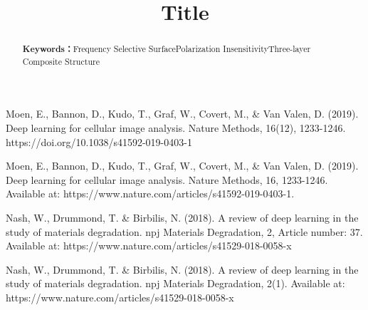 \documentclass[withoutpreface,bwprint]{cumcmthesis}
\title{Title}
\begin{document}
 \maketitle
\renewcommand{\abstractname}{Abstract}
\renewcommand{\keywords}{\textbf{Keywords：}}
\begin{abstract}
\begin{spacing}{1.6}

\end{spacing}
\noindent\keywords{Frequency Selective Surface\quad Polarization Insensitivity\quad Three-layer Composite Structure}
\end{abstract}

 \newpage


 


%

\newpage
\begin{thebibliography}{99}

 Moen, E., Bannon, D., Kudo, T., Graf, W., Covert, M., \& Van Valen, D. (2019). Deep learning for cellular image analysis. Nature Methods, 16(12), 1233-1246. https://doi.org/10.1038/s41592-019-0403-1

Moen, E., Bannon, D., Kudo, T., Graf, W., Covert, M., \& Van Valen, D. (2019). Deep learning for cellular image analysis. Nature Methods, 16, 1233-1246. Available at: https://www.nature.com/articles/s41592-019-0403-1.

Nash, W., Drummond, T. \& Birbilis, N. (2018). A review of deep learning in the study of materials degradation. npj Materials Degradation, 2, Article number: 37. Available at: https://www.nature.com/articles/s41529-018-0058-x

Nash, W., Drummond, T. \& Birbilis, N. (2018). A review of deep learning in the study of materials degradation. npj Materials Degradation, 2(1). Available at: https://www.nature.com/articles/s41529-018-0058-x 

\end{thebibliography}

%
%
%

\newpage

\end{document}
